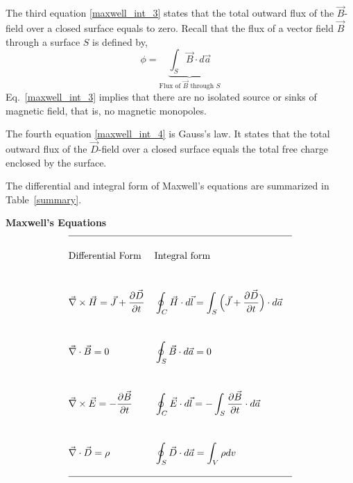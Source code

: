\documentclass[12pt,a4paper,oneside]{book}
\begin{document}
\begin{onehalfspace}
The third equation \ref{maxwell_int_3} states that the total outward flux of the $\vec{B}$-field over a closed surface equals to zero. Recall that the flux of a vector field $\vec{B}$ through a surface $S$ is defined by, 
\begin{equation*}\label{}
	\phi = \underbrace{\int_{S}\vec{B}\cdot d\vec{a}}_{\text{Flux of $\vec{B}$ through $S$}}
\end{equation*}
Eq.~\eqref{maxwell_int_3} implies that there are no isolated source or sinks of magnetic field, that is, no magnetic monopoles. 

The fourth equation \eqref{maxwell_int_4} is Gauss's law. It states that the total outward flux of the $\vec{D}$-field over a closed surface equals the total free charge enclosed by the surface. 

The differential and integral form of Maxwell's equations are summarized in Table~\ref{summary}.
\begin{table}
\centering \textbf{Maxwell's Equations} \\
	\begin{align*}
		\hline \\
		&\text{Differential Form} 	& 	&\text{Integral form} \\[24pt] 
		&\vec{\nabla}\times\vec{H}=\vec{J} + \frac{\partial \vec{D}}{\partial t}	& 	
		&\oint_C\vec{H}\cdot d\vec{l}=\int_S\Big(\vec{J} + \frac{\partial \vec{D}}{\partial t}\Big)\cdot 	d\vec{a}		\\[24pt]  
		&\vec{\nabla} \cdot\vec{B}=0	&
		&\oint_{S}\vec{B}\cdot d\vec{a}=0 \\[24pt] 
		&\vec{\nabla}\times\vec{E}=- \frac{\partial \vec{B}}{\partial t}	&	
		&\oint_{C}\vec{E}\cdot d\vec{l}=-\int_{S}\frac{\partial \vec{B}}{\partial t}\cdot d\vec{a} \\[24pt] 
		&\vec{\nabla}\cdot\vec{D}=\rho	&
		&\oint_{S}\vec{D}\cdot d\vec{a}=\int_{V}\rho dv	\\[12pt] 
		\hline
	\end{align*}
\caption{Differential and integral form of Maxwell's equations.}
\label{summary}
\end{table}

\end{onehalfspace}
\end{document}
